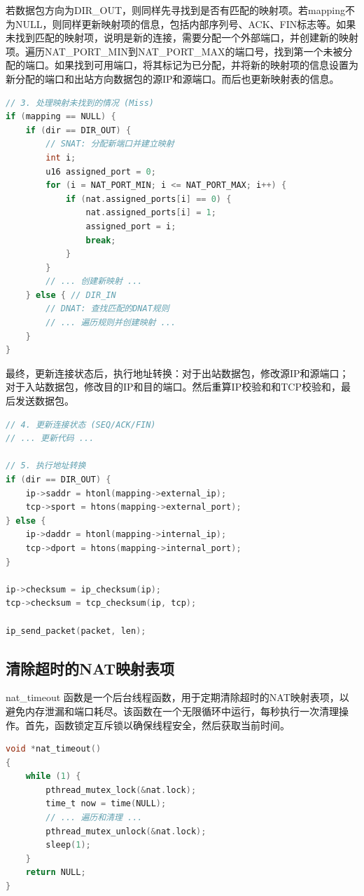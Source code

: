 \documentclass[11pt]{article}
\begin{document}
若数据包方向为DIR_OUT，则同样先寻找到是否有匹配的映射项。若mapping不为NULL，则同样更新映射项的信息，包括内部序列号、ACK、FIN标志等。如果未找到匹配的映射项，说明是新的连接，需要分配一个外部端口，并创建新的映射项。遍历NAT_PORT_MIN到NAT_PORT_MAX的端口号，找到第一个未被分配的端口。如果找到可用端口，将其标记为已分配，并将新的映射项的信息设置为新分配的端口和出站方向数据包的源IP和源端口。而后也更新映射表的信息。

\begin{lstlisting}[language=C]
// 3. 处理映射未找到的情况 (Miss)
if (mapping == NULL) {
    if (dir == DIR_OUT) {
        // SNAT: 分配新端口并建立映射
        int i;
        u16 assigned_port = 0;
        for (i = NAT_PORT_MIN; i <= NAT_PORT_MAX; i++) {
            if (nat.assigned_ports[i] == 0) {
                nat.assigned_ports[i] = 1;
                assigned_port = i;
                break;
            }
        }
        // ... 创建新映射 ...
    } else { // DIR_IN
        // DNAT: 查找匹配的DNAT规则
        // ... 遍历规则并创建映射 ...
    }
}
\end{lstlisting}

最终，更新连接状态后，执行地址转换：对于出站数据包，修改源IP和源端口；对于入站数据包，修改目的IP和目的端口。然后重算IP校验和和TCP校验和，最后发送数据包。

\begin{lstlisting}[language=C]
// 4. 更新连接状态 (SEQ/ACK/FIN)
// ... 更新代码 ...

// 5. 执行地址转换
if (dir == DIR_OUT) {
    ip->saddr = htonl(mapping->external_ip);
    tcp->sport = htons(mapping->external_port);
} else {
    ip->daddr = htonl(mapping->internal_ip);
    tcp->dport = htons(mapping->internal_port);
}

ip->checksum = ip_checksum(ip);
tcp->checksum = tcp_checksum(ip, tcp);

ip_send_packet(packet, len);
\end{lstlisting}

\subsection{清除超时的NAT映射表项}

nat_timeout 函数是一个后台线程函数，用于定期清除超时的NAT映射表项，以避免内存泄漏和端口耗尽。该函数在一个无限循环中运行，每秒执行一次清理操作。首先，函数锁定互斥锁以确保线程安全，然后获取当前时间。

\begin{lstlisting}[language=C]
void *nat_timeout()
{
    while (1) {
        pthread_mutex_lock(&nat.lock);
        time_t now = time(NULL);
        // ... 遍历和清理 ...
        pthread_mutex_unlock(&nat.lock);
        sleep(1);
    }
    return NULL;
}
\end{lstlisting}
\end{document}
